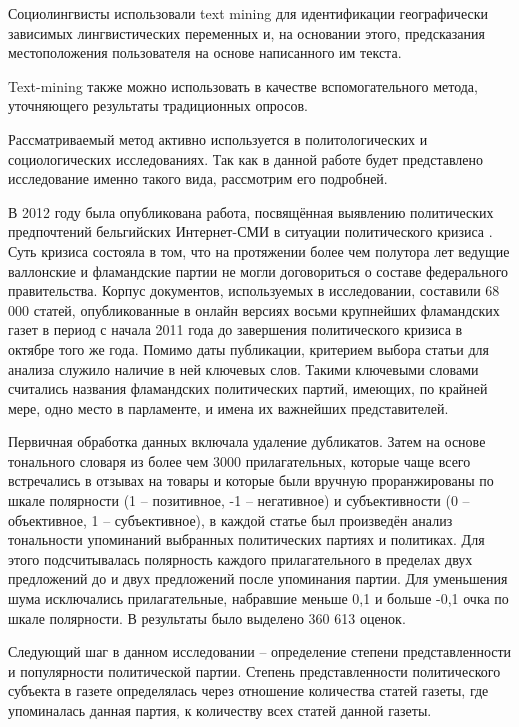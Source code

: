 Социолингвисты использовали text mining для идентификации географически зависимых лингвистических переменных и, на основании этого, предсказания местоположения пользователя на основе написанного им текста\cite{geographic_lexical_variation}.

Text-mining также можно использовать в качестве вспомогательного метода, уточняющего результаты традиционных опросов\cite{tweets_to_polls}.

Рассматриваемый метод активно используется в политологических и социологических исследованиях. Так как в данной работе будет представлено исследование именно такого вида, рассмотрим его подробней.

В 2012 году была опубликована работа, посвящённая выявлению политических предпочтений бельгийских Интернет-СМИ в ситуации политического кризиса \cite{MediaCoverage2012}. Суть кризиса состояла в том, что на протяжении более чем полутора лет ведущие валлонские и фламандские партии не могли договориться о составе федерального правительства. Корпус документов, используемых в исследовании, составили 68 000 статей, опубликованные в онлайн версиях восьми крупнейших фламандских газет в период с начала 2011 года до завершения политического кризиса в октябре того же года. Помимо даты публикации, критерием выбора статьи для анализа служило наличие в ней ключевых слов. Такими ключевыми словами считались названия фламандских политических партий, имеющих, по крайней мере, одно место в парламенте, и имена их важнейших представителей.

Первичная обработка данных включала удаление дубликатов. Затем на основе тонального словаря из более чем 3000 прилагательных, которые чаще всего встречались в отзывах на товары и которые были вручную проранжированы по шкале полярности (1 -- позитивное, -1 -- негативное) и субъективности (0 -- объективное, 1 -- субъективное), в каждой статье был произведён анализ тональности упоминаний выбранных политических партиях и политиках. Для этого подсчитывалась полярность каждого прилагательного в пределах двух предложений до и двух предложений после упоминания партии. Для уменьшения шума исключались прилагательные, набравшие меньше 0,1 и больше -0,1 очка по шкале полярности. В результаты было выделено 360 613 оценок.

Следующий шаг в данном исследовании -- определение степени представленности и популярности политической партии. Степень представленности политического субъекта в газете определялась через отношение количества статей газеты, где упоминалась данная партия, к количеству всех статей данной газеты.

